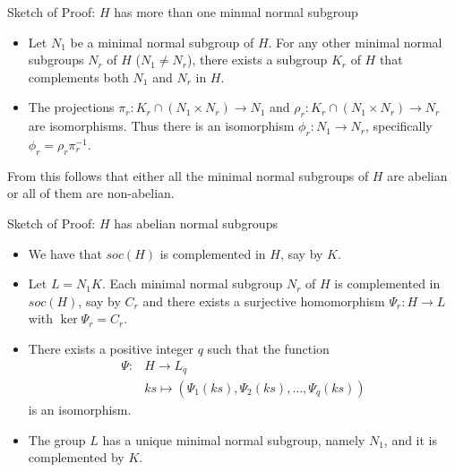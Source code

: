 \documentclass{beamer}
\begin{document}
\begin{frame}{Sketch of Proof: $H$ has more than one minmal normal subgroup}
    \begin{itemize}
        \item Let $N_1$ be a minimal normal subgroup of $H$. For any other minimal normal subgroups $N_r$ of $H$ ($N_1 \ne N_r$), there exists a subgroup $K_r$ of $H$ that complements both $N_1$ and $N_r$ in $H$.
        \item<2-> The projections $\pi_r : K_r \cap (N_1 \times N_r) \rightarrow N_1$ and $\rho_r : K_r \cap (N_1 \times N_r) \rightarrow N_r$ are isomorphisms. Thus there is an isomorphism $\phi_r : N_1 \rightarrow N_r$, specifically $\phi_r = \rho_r\pi_r^{-1}$.
    \end{itemize}
     From this follows that either all the minimal normal subgroups of $H$ are abelian or all of them are non-abelian.
\end{frame}

\begin{frame}{Sketch of Proof: $H$ has abelian normal subgroups}
    \begin{itemize}
        \item We have that $soc(H)$ is complemented in $H$, say by $K$.
        \item<2-> Let $L = N_1K$. Each minimal normal subgroup $N_r$ of $H$ is complemented in $soc(H)$, say by $C_r$ and there exists a surjective homomorphism $\Psi_r \colon H \rightarrow L$ with $\ker \Psi_r = C_r$.
        \item<3-> There exists a positive integer $q$ such that the function 
        \begin{align*}
            \Psi \colon &H \longrightarrow L_q \\
                     &ks \mapsto  (\Psi_1(ks),\Psi_2(ks),\ldots ,\Psi_q(ks))
        \end{align*} is an isomorphism.
        \item<4-> The group $L$ has a unique minimal normal subgroup, namely $N_1$, and it is complemented by $K$.
    \end{itemize}
\end{frame}
\end{document}
